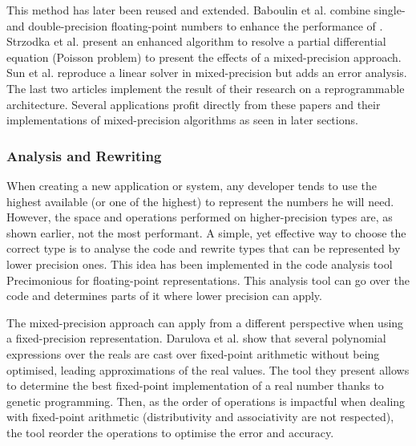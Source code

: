 This method has later been reused and extended. Baboulin et al. \cite{Baboulin2009} combine single- and double-precision floating-point numbers to enhance the performance of . Strzodka et al. \cite{Strzodka2006} present an enhanced algorithm to resolve a partial differential equation (Poisson problem) to present the effects of a mixed-precision approach. Sun et al. \cite{Sun2008} reproduce a linear solver in mixed-precision but adds an error analysis. The last two articles implement the result of their research on a reprogrammable architecture. Several applications profit directly from these papers and their implementations of mixed-precision algorithms as seen in later sections.

\subsubsection{Analysis and Rewriting}

When creating a new application or system, any developer tends to use the highest available (or one of the highest) to represent the numbers he will need. However, the space and operations performed on higher-precision types are, as shown earlier, not the most performant. A simple, yet effective way to choose the correct type is to analyse the code and rewrite types that can be represented by lower precision ones. This idea has been implemented in the code analysis tool Precimonious \cite{Rubio2013} for floating-point representations. This analysis tool can go over the code and determines parts of it where lower precision can apply.

The mixed-precision approach can apply from a different perspective when using a fixed-precision representation. Darulova et al. \cite{Darulova2013} show that several polynomial expressions over the reals are cast over fixed-point arithmetic without being optimised, leading approximations of the real values. The tool they present allows to determine the best fixed-point implementation of a real number thanks to genetic programming. Then, as the order of operations is impactful when dealing with fixed-point arithmetic (distributivity and associativity are not respected), the tool reorder the operations to optimise the error and accuracy.

